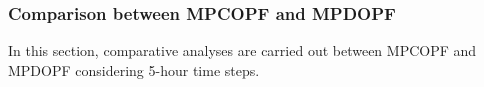 \documentclass[../../outputs/main.tex]{subfiles}
\begin{document}
\subsubsection{Comparison between MPCOPF and MPDOPF}
In this section, comparative analyses are carried out between MPCOPF and MPDOPF considering 5-hour time steps.



\end{document}
